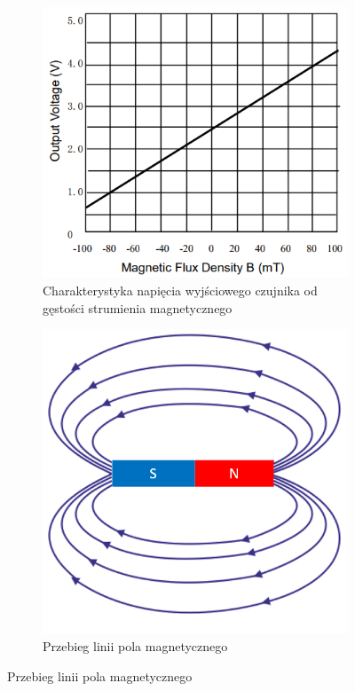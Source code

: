 \documentclass[11pt, a4paper]{article}
\begin{document}
\vspace{0.25cm}
\begin{figure}[h]
\centering
\begin{subfigure}{.47\textwidth}
\centering
\includegraphics[width=1.0\linewidth]{fig/KY-024/zasada_dzialania/characteristics.png}
\caption{\centering Charakterystyka napięcia wyjściowego czujnika od gęstości strumienia magnetycznego \cite{49E_datasheet}}
\label{fig:_charakterystyka}
\end{subfigure}%
\begin{subfigure}{.6\textwidth}
\centering
\includegraphics[width=.7\linewidth]{fig/KY-024/zasada_dzialania/pole_mag.png}
\caption{Przebieg linii pola magnetycznego }
\label{fig:_zasada_pole_mag}
\end{subfigure}
\label{fig:element}
\end{figure}
\end{document}

